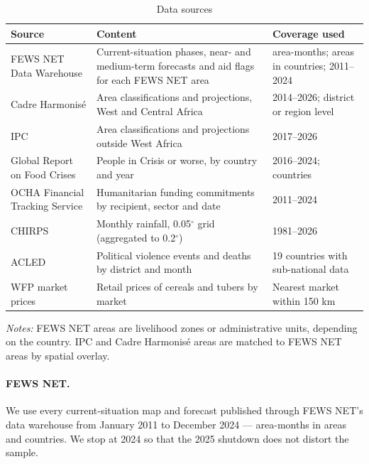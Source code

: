 \documentclass[11pt]{article}
\begin{document}
\begin{table}[t]
\centering
\begin{threeparttable}
\caption{Data sources}\label{tab:data}
\small
\begin{tabular}{L{4.3cm}L{6.0cm}L{4.4cm}}
\toprule
Source & Content & Coverage used \\
\midrule
FEWS NET Data Warehouse \citep{fewsnetdata} & Current-situation phases, near- and medium-term forecasts and aid flags for each FEWS NET area & \csAreaMonths{} area-months; \csAreas{} areas in \csCountries{} countries; 2011--2024 \\[3pt]
Cadre Harmonis\'e \citep{chdata} & Area classifications and projections, West and Central Africa & 2014--2026; district or region level \\[3pt]
IPC \citep{ipcdata} & Area classifications and projections outside West Africa & 2017--2026 \\[3pt]
Global Report on Food Crises \citep{GRFC2025} & People in Crisis or worse, by country and year & 2016--2024; \covCountries{} countries \\[3pt]
OCHA Financial Tracking Service \citep{OCHAFTS} & Humanitarian funding commitments by recipient, sector and date & 2011--2024 \\[3pt]
CHIRPS \citep{funk2015chirps} & Monthly rainfall, 0.05$^\circ$ grid (aggregated to 0.2$^\circ$) & 1981--2026 \\[3pt]
ACLED \citep{raleigh2010acled,acledhdx} & Political violence events and deaths by district and month & 19 countries with sub-national data \\[3pt]
WFP market prices \citep{wfpprices} & Retail prices of cereals and tubers by market & Nearest market within 150 km \\
\bottomrule
\end{tabular}
\begin{tablenotes}\footnotesize
\item \textit{Notes:} FEWS NET areas are livelihood zones or administrative units, depending on the country. IPC and Cadre Harmonis\'e areas are matched to FEWS NET areas by spatial overlay.
\end{tablenotes}
\end{threeparttable}
\end{table}

\paragraph{FEWS NET.} We use every current-situation map and forecast published through FEWS NET's data warehouse from January 2011 to December 2024 --- \csAreaMonths{} area-months in \csAreas{} areas and \csCountries{} countries. We stop at 2024 so that the 2025 shutdown does not distort the sample.
\end{document}
